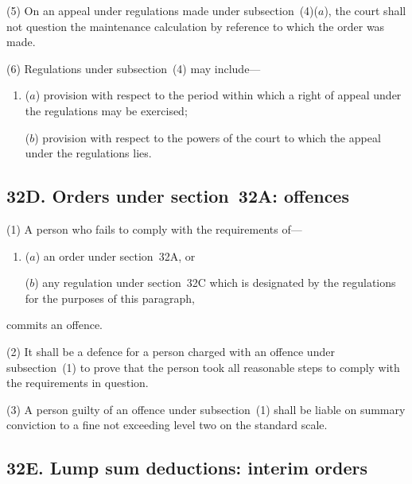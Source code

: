 \documentclass[12pt,a4paper]{article}
\begin{document}
\begin{sloppypar}
(5)
On an appeal under regulations made under subsection~(4)($a$), the court shall not question the maintenance calculation by reference to which the order was made.
\end{sloppypar}

(6)
Regulations under subsection~(4) may include---
\begin{enumerate}\item[]
($a$) provision with respect to the period within which a right of appeal under the regulations may be exercised;

($b$) provision with respect to the powers of the court to which the appeal under the regulations lies.
\end{enumerate}


\subsection{32D. Orders under section~32A: offences}

(1) A person who fails to comply with the requirements of---
\begin{enumerate}\item[]
($a$) an order under section~32A, or

($b$) any regulation under section~32C which is designated by the regulations for
the purposes of this paragraph, 
\end{enumerate}
commits an offence.

(2)
It shall be a defence for a person charged with an offence under subsection~(1) to prove that the person took all reasonable steps to comply with the requirements in question.

(3)
A person guilty of an offence under subsection~(1) shall be liable on summary conviction to a fine not exceeding level two on the standard scale.


\subsection{32E. Lump sum deductions: interim orders}
\end{document}
